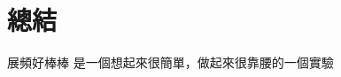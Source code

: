 \documentclass[class=NCU_thesis, crop=false]{standalone}
\begin{document}
\chapter{總結}
展頻好棒棒
是一個想起來很簡單，做起來很靠腰的一個實驗
\end{document}
